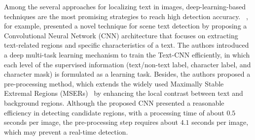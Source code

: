 %


Among the several approaches for localizing text in images, deep-learning-based techniques are the most promising strategies to reach high detection accuracy. ~\cite{He2016TIP}, for example, presented a novel technique for scene text detection by proposing a Convolutional Neural Network (CNN) architecture that focuses on extracting text-related regions and specific characteristics of a text. The authors introduced a deep multi-task learning mechanism to train the Text-CNN efficiently, in which each level of the supervised information (text/non-text label, character label, and character mask) is formulated as a learning task. Besides, the authors proposed a pre-processing method, which extends the widely used Maximally Stable Extremal Regions (MSERs)~\cite{Matas2004IVC} by enhancing the local contrast between text and background regions. %
Although the proposed CNN presented a reasonable efficiency in detecting candidate regions, with a processing time of about $0.5$ seconds per image, the pre-processing step requires about $4.1$ seconds per image, which may prevent a real-time detection. 

